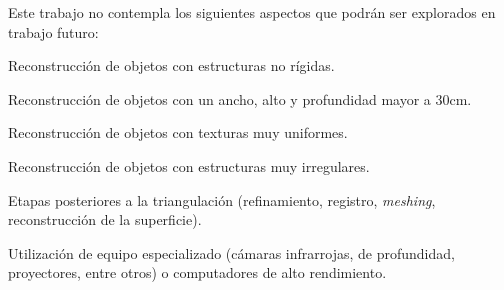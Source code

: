 Este trabajo no contempla los siguientes aspectos que podr\'{a}n ser explorados en trabajo futuro:
\begin{itemize*}
\item Reconstrucci\'{o}n de objetos con estructuras no r\'{i}gidas.
\item Reconstrucci\'{o}n de objetos con un ancho, alto y profundidad mayor a 30cm.
\item Reconstrucci\'{o}n de objetos con texturas muy uniformes.
\item Reconstrucci\'{o}n de objetos con estructuras muy irregulares.
\item Etapas posteriores a la triangulaci\'{o}n (refinamiento, registro, \textit{meshing}, reconstrucci\'{o}n de la superficie).
\item Utilizaci\'{o}n de equipo especializado (c\'{a}maras infrarrojas, de profundidad, proyectores, entre otros) o computadores de alto rendimiento.
\end{itemize*}




